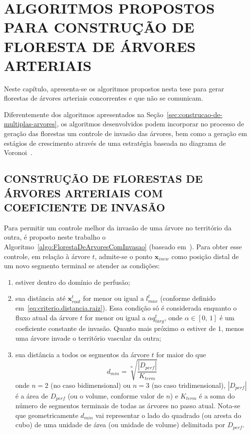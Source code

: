 \chapter{ALGORITMOS PROPOSTOS PARA CONSTRUÇÃO DE FLORESTA DE ÁRVORES ARTERIAIS} \label{sec:algoritmos-propostos}

Neste capítulo, apresenta-se os algoritmos propostos nesta tese para gerar florestas de árvores 
arteriais concorrentes e que não se comunicam.

Diferentemente dos algoritmos apresentados na Seção~\ref{sec:construcao-de-multiplas-arvores}, 
os algoritmos desenvolvidos podem incorporar no processo de geração das florestas 
um controle de invasão das árvores, bem como a geração em estágios de crescimento através 
de uma estratégia baseada no diagrama de Voronoi~\cite{Aurenhammer2004}.

\section{CONSTRUÇÃO DE FLORESTAS DE ÁRVORES ARTERIAIS COM COEFICIENTE DE INVASÃO} \label{sec:floresta-com-invasao}

Para permitir um controle melhor da invasão de uma árvore no território da outra, é proposto 
neste trabalho o Algoritmo~\ref{algo:FlorestaDeArvoresComInvasao} 
(baseado em~\cite{Jaquet2019}). Para obter esse controle, 
em relação à árvore $t$, admite-se o ponto $\mathbf{x}_{inew}$ 
como posição distal de um novo segmento terminal se atender as condições:
\begin{enumerate}[label=(\roman*)]
 \item estiver dentro do domínio de perfusão;
 \item sua distância 
até $\mathbf{x}_{root}^t$ for menor ou igual a $l_{max}^t$ 
(conforme definido em~\eqref{eq:criterio.distancia.raiz}). Essa condição 
só é considerada enquanto o fluxo atual da árvore $t$ for menor ou igual a $\alpha q^t_{targ}$, 
onde $\alpha\in[0,\,1]$ é um coeficiente constante de invasão. Quanto mais próximo $\alpha$ estiver de $1$, menos 
uma árvore invade o território vascular da outra;
 \item sua distância a todos os segmentos da árvore $t$ for maior do que 
 \begin{equation}
   d_{min} = \sqrt[n]{\dfrac{|D_{perf}|}{K_{term}}}
   \label{eq:distancia-minima}
 \end{equation}
 onde $n = 2$ (no caso bidimensional) ou 
 $n = 3$ (no caso tridimensional), $|D_{perf}|$ é a área de $D_{perf}$ (ou o volume, conforme valor de $n$)
 e $K_{term}$ é a soma do número de segmentos terminais de todas as árvores no passo atual. Nota-se que 
 geometricamente $d_{min}$ vai representar o lado do quadrado (ou aresta do cubo) de uma unidade 
 de área (ou unidade de volume) delimitada por $D_{perf}$.
\end{enumerate}

